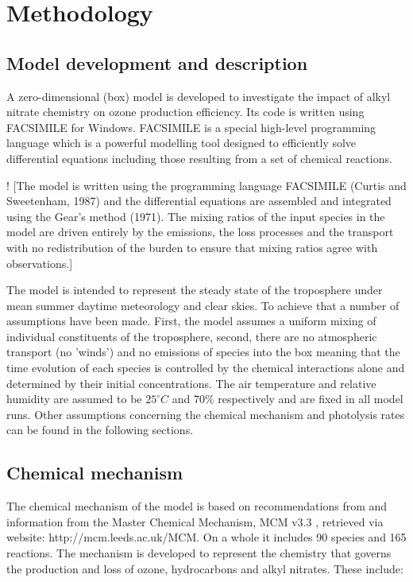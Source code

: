 \documentclass[11pt,a4paper]{article}
\begin{document}
\section{Methodology} \label{sec:method}
\subsection{Model development and description}\label{sec:method_develop}
A zero-dimensional (box) model is developed to investigate the impact of alkyl nitrate chemistry on ozone production efficiency. Its code is written using FACSIMILE for Windows. FACSIMILE is a special high-level programming language which is a powerful modelling tool designed to efficiently solve differential equations including those resulting from a set of chemical reactions.

! \citep{Newland2013}
[The model is written using the programming language FACSIMILE (Curtis and Sweetenham, 1987) and the differential equations are assembled and integrated using the Gear’s method (1971). The mixing ratios of the input species in the model are driven entirely by the emissions, the loss processes and the transport with no redistribution of the burden to ensure that mixing ratios agree with observations.]

The model is intended to represent the steady state of the troposphere under mean summer daytime meteorology and clear skies. To achieve that a number of assumptions have been made. First, the model assumes a uniform mixing of individual constituents of the troposphere, second, there are no atmospheric transport (no 'winds') and no emissions of species into the box meaning that the time evolution of each species is controlled by the chemical interactions alone and determined by their initial concentrations. The air temperature and relative humidity are assumed to be $25^{\circ}C$ and 70\% respectively and are fixed in all model runs. Other assumptions concerning the chemical mechanism and photolysis rates can be found in the following sections.

\subsection{Chemical mechanism}\label{sec:method_chem}
The chemical mechanism of the model is based on recommendations from \citep{Atkinson2004} and information from the Master Chemical Mechanism, MCM v3.3 \citep{Jenkin1997,Saunders2003}, retrieved via website: http://mcm.leeds.ac.uk/MCM. On a whole it includes 90 species and 165 reactions. The mechanism is developed to represent the chemistry that governs the production and loss of ozone, hydrocarbons and alkyl nitrates. These include:
\end{document}

